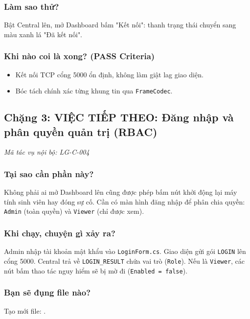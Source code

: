 \documentclass[12pt,a4paper]{article}
\begin{document}
\subsubsection{Làm sao thử?}
Bật Central lên, mở Dashboard bấm "Kết nối": thanh trạng thái chuyển sang màu xanh lá "Đã kết nối".

\subsubsection{Khi nào coi là xong? (PASS Criteria)}
\begin{itemize}
  \item Kết nối TCP cổng 5000 ổn định, không làm giật lag giao diện.
  \item Bóc tách chính xác từng khung tin qua \texttt{FrameCodec}.
\end{itemize}

\subsection{Chặng 3: VIỆC TIẾP THEO: Đăng nhập và phân quyền quản trị (RBAC)}
{\footnotesize\color{lgGray}\textit{Mã tác vụ nội bộ: LG-C-004}}\par
\vspace{2mm}

\subsubsection{Tại sao cần phần này?}
Không phải ai mở Dashboard lên cũng được phép bấm nút khởi động lại máy tính sinh viên hay đóng sự cố. Cần có màn hình đăng nhập để phân chia quyền: \texttt{Admin} (toàn quyền) và \texttt{Viewer} (chỉ được xem).

\subsubsection{Khi chạy, chuyện gì xảy ra?}
Admin nhập tài khoản mật khẩu vào \texttt{LoginForm.cs}. Giao diện gửi gói \texttt{LOGIN} lên cổng 5000. Central trả về \texttt{LOGIN\_RESULT} chứa vai trò (\texttt{Role}). Nếu là \texttt{Viewer}, các nút bấm thao tác nguy hiểm sẽ bị mờ đi (\texttt{Enabled = false}).

\subsubsection{Bạn sẽ đụng file nào?}
Tạo mới file: .
\end{document}
